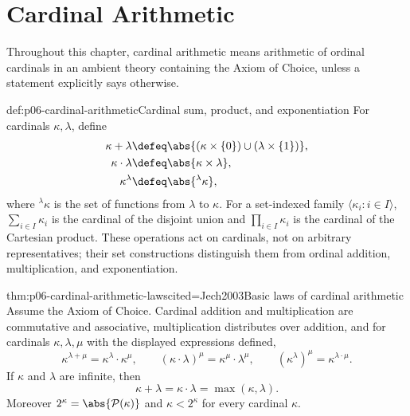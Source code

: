 \chapter{Cardinal Arithmetic}
\label{sec:p06-cardinal-arithmetic}

Throughout this chapter, cardinal arithmetic means arithmetic of
ordinal cardinals in an ambient theory containing the Axiom of Choice, unless
a statement explicitly says otherwise.

\begin{hbdefinition}{def:p06-cardinal-arithmetic}{Cardinal sum, product, and exponentiation}
For cardinals \(\kappa,\lambda\), define
\[
\begin{aligned}
  \kappa+\lambda
    &\defeq\abs{(\kappa\times\{0\})\cup(\lambda\times\{1\})},\\
  \kappa\cdot\lambda
    &\defeq\abs{\kappa\times\lambda},\\
  \kappa^\lambda
    &\defeq\abs{{}^{\lambda}\kappa},
\end{aligned}
\]
where \({}^{\lambda}\kappa\) is the set of functions from \(\lambda\) to
\(\kappa\).  For a set-indexed family \(\langle\kappa_i:i\in I\rangle\),
\(\sum_{i\in I}\kappa_i\) is the cardinal of the disjoint union and
\(\prod_{i\in I}\kappa_i\) is the cardinal of the Cartesian product.
These operations act on cardinals, not on arbitrary representatives; their
set constructions distinguish them from ordinal addition, multiplication,
and exponentiation.
\end{hbdefinition}

\begin{hbtheorem}{thm:p06-cardinal-arithmetic-laws}{cited=Jech2003}{Basic laws of cardinal arithmetic}
Assume the Axiom of Choice.  Cardinal addition and multiplication are
commutative and associative, multiplication distributes over addition, and
for cardinals \(\kappa,\lambda,\mu\) with the displayed expressions defined,
\[
  \kappa^{\lambda+\mu}=\kappa^\lambda\cdot\kappa^\mu,
  \qquad
  (\kappa\cdot\lambda)^\mu=\kappa^\mu\cdot\lambda^\mu,
  \qquad
  (\kappa^\lambda)^\mu=\kappa^{\lambda\cdot\mu}.
\]
If \(\kappa\) and \(\lambda\) are infinite, then
\[
  \kappa+\lambda=\kappa\cdot\lambda=\max(\kappa,\lambda).
\]
Moreover \(2^\kappa=\abs{\mathcal P(\kappa)}\) and
\(\kappa<2^\kappa\) for every cardinal \(\kappa\).
\end{hbtheorem}

